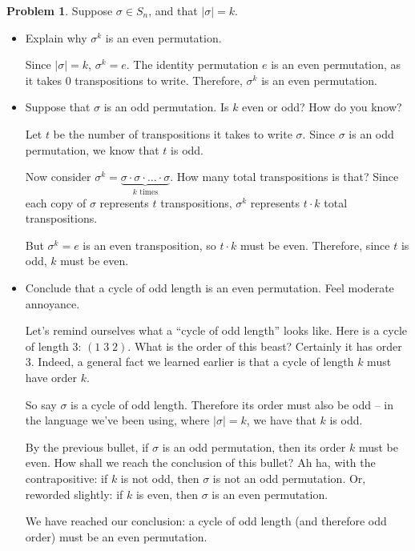 \documentclass[12pt]{article}
\theoremstyle{definition} %
\newtheorem{problem}{Problem}
\newenvironment{red}{\color{red}}{\ignorespacesafterend}
\begin{document}
\begin{problem}
    Suppose $\sigma \in S_n$, and that $|\sigma| = k$. 
    \begin{itemize}
        \item Explain why $\sigma^k$ is an even permutation.

        \begin{red}
            Since $|\sigma| = k$, $\sigma^k = e$. The identity permutation $e$ is an even permutation, as it takes 0 transpositions to write. Therefore, $\sigma^k$ is an even permutation.
        \end{red}
        \item Suppose that $\sigma$ is an odd permutation. Is $k$ even or odd? How do you know?

        \begin{red}
            Let $t$ be the number of transpositions it takes to write $\sigma$. Since $\sigma$ is an odd permutation, we know that $t$ is odd.

            Now consider $\sigma^k = \underbrace{\sigma \cdot \sigma \cdot \ldots \cdot \sigma}_{k \text{ times}}$. How many total transpositions is that? Since each copy of $\sigma$ represents $t$ transpositions, $\sigma^k$ represents $t\cdot k$ total transpositions. 

            But $\sigma^k = e$ is an even transposition, so $t\cdot k$ must be even. Therefore, since $t$ is odd, $k$ must be even.
        \end{red}
        \item Conclude that a cycle of odd length is an even permutation. Feel moderate annoyance.

        \begin{red}
            Let's remind ourselves what a ``cycle of odd length'' looks like. Here is a cycle of length 3: $(1\;3\;2)$. What is the order of this beast? Certainly it has order 3. Indeed, a general fact we learned earlier is that a cycle of length $k$ must have order $k$.

            So say $\sigma$ is a cycle of odd length. Therefore its order must also be odd -- in the language we've been using, where $|\sigma| = k$, we have that $k$ is odd.

            By the previous bullet, if $\sigma$ is an odd permutation, then its order $k$ must be even. How shall we reach the conclusion of this bullet? Ah ha, with the contrapositive: if $k$ is not odd, then $\sigma$ is not an odd permutation. Or, reworded slightly: if $k$ is even, then $\sigma$ is an even permutation.

            We have reached our conclusion: a cycle of odd length (and therefore odd order) must be an even permutation.
        \end{red}
    \end{itemize}
\end{problem}
\end{document}
